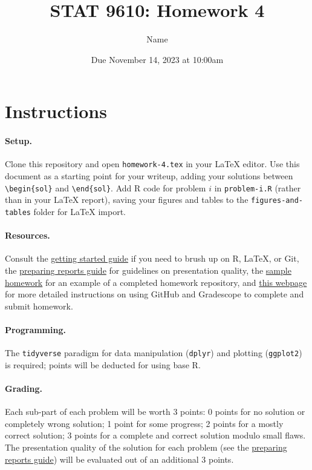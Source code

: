\documentclass[11pt,letterpaper,english,oneside]{article} %
\author{Name}
\title{STAT 9610: Homework 4}
\date{Due November 14, 2023 at 10:00am}
\theoremstyle{definition} %
\newtheorem{solution}{Solution}
\newenvironment{sol}{\begin{solution}\hspace{0pt}}{\end{solution}}
\begin{document}
\maketitle

\section{Instructions}

\paragraph{Setup.} Clone this repository and open \verb|homework-4.tex| in your LaTeX editor. Use this document as a starting point for your writeup, adding your solutions between \verb|\begin{sol}| and \verb|\end{sol}|. Add R code for problem $i$ in \verb|problem-i.R| (rather than in your LaTeX report), saving your figures and tables to the \verb|figures-and-tables| folder for LaTeX import. 

\paragraph{Resources.}

Consult the \href{https://katsevich-teaching.github.io/stat-9610-fall-2023/assets/getting-started.pdf}{getting started guide} if you need to brush up on R, LaTeX, or Git, the \href{https://katsevich-teaching.github.io/stat-9610-fall-2023/assets/preparing-reports.pdf}{preparing reports guide} for guidelines on presentation quality, the \href{https://github.com/stat-9610-fall-2023/sample-homework-stat-9610}{sample homework} for an example of a completed homework repository, and \href{https://hmc-cs-131-spring2020.github.io/howtos/assignments.html}{this webpage} for more detailed instructions on using GitHub and Gradescope to complete and submit homework.

\paragraph{Programming.}

The \verb|tidyverse| paradigm for data manipulation (\verb|dplyr|) and plotting (\verb|ggplot2|) is required; points will be deducted for using base R. 

\paragraph{Grading.} Each sub-part of each problem will be worth 3 points: 0 points for no solution or completely wrong solution; 1 point for some progress; 2 points for a mostly correct solution; 3 points for a complete and correct solution modulo small flaws. The presentation quality of the solution for each problem (see the \href{https://katsevich-teaching.github.io/stat-9610-fall-2023/assets/preparing-reports.pdf}{preparing reports guide}) will be evaluated out of an additional 3 points.
\end{document}
